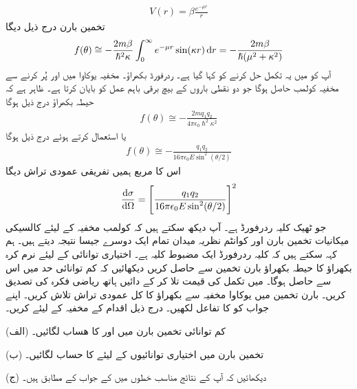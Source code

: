 \begin{align}
	V(r) = \beta\frac{e^{-\mu r}}{r}
\end{align}
تخمین بارن درج ذیل دیگا 
\begin{align}
	f(\theta)\cong-\frac{2m\beta}{\hslash^2\kappa}\int_{0}^{\infty}e^{-\mu r}\sin(\kappa r)\dif r=-\frac{2m\beta}{\hslash(\mu^2+\kappa^2)}
\end{align}
آپ کو  میں یہ تکمل حل کرنے کو کہا گیا ہے۔
ردرفورڈ بکھراؤ۔ مخفیہ یوکاوا میں  اور  پُر کرنے سے مخفیہ کولمب حاصل ہوگا جو دو نقطی باروں کے بیچ برقی باہم عمل کو بایان کرتا ہے۔ ظاہر ہے کہ حیطہ بکھراؤ درج ذیل ہوگا 
\begin{align}
	f(\theta)\cong-\frac{2mq_1q_2}{4\pi\epsilon_0\hslash^2\kappa^2}
\end{align}
یا  استعمال کرتے ہوئے درج ذیل ہوگا 
\begin{align}
	f(\theta)\cong-\frac{q_1q_2}{16\pi\epsilon_0E\sin^2(\theta/2)}
\end{align}
اس کا مربع ہمیں تفریقی عمودی تراش دیگا 
\begin{align}
	\frac{\dif\sigma}{\dif\Omega}=\left[\frac{q_1q_2}{16\pi\epsilon_0E\sin^2(\theta/2)}\right]^2
\end{align}
جو ٹھیک کلیہ ردرفورڈ  ہے۔ آپ دیکھ سکتے ہیں کہ کولمب مخفیہ کے لیئے کالسیکی میکانیات تخمین بارن اور کوانٹم نظریہ میدان تمام ایک دوسرے جیسا نتیجہ دیتے ہیں۔ ہم کہہ سکتے ہیں کہ کلیہ ردرفورڈ ایک مضبوط کلیہ ہے۔
اختیاری توانائی کے لیئے نرم کرہ بکھراؤ کا حیطہ بکھراؤ بارن تخمین سے حاصل کریں دیکھائیں کہ کم توانائی حد میں اس سے  حاصل ہوگا۔
 میں تکمل کی قیمت تلا کر کے دائیں ہاتھ ریاضی فکرہ کی تصدیق کریں۔
بارن تخمین میں یوکاوا مخفیہ سے بکھراؤ کا کل عمودی تراش تلاش کریں۔ اپنے جواب کو  کا تفاعل لکھیں۔
درج ذیل اقدام  کے مخفیہ کے لیئے کریں۔

(الف) کم توانائی تخمین بارن میں  اور  کا ھساب لگائیں۔

(ب) تخمین بارن میں اختیاری توانائیوں کے لیئے  کا حساب لگائیں۔

(ج) دیکھائیں کہ آپ کے نتائج مناسب خطوں میں  کے جواب کے مطابق ہیں۔


